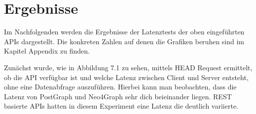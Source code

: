 \chapter{Ergebnisse} %
\label{sec:ergebnisse}
Im Nachfolgenden werden die Ergebnisse der Latenztests der oben eingeführten APIs dargestellt. Die konkreten Zahlen auf denen die Grafiken beruhen sind im Kapitel Appendix zu finden.

\noindent
Zunächst wurde, wie in Abbildung 7.1 zu sehen, mittels HEAD Request ermittelt, ob die API verfügbar ist und welche Latenz zwischen Client und Server entsteht, ohne eine Datenabfrage auszuführen. Hierbei kann man beobachten, dass die Latenz von PostGraph und Neo4Graph sehr dich beieinander liegen. REST basierte APIs hatten in diesem Experiment eine Latenz die deutlich variierte.

